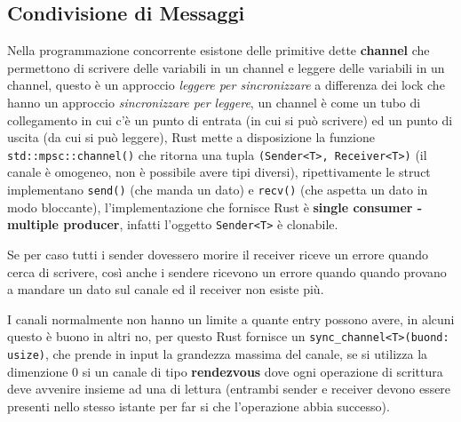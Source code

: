 \documentclass[12pt]{article}
\begin{document}
\subsection{Condivisione di Messaggi}
Nella programmazione concorrente esistone delle primitive dette \textbf{channel} che permettono di scrivere delle variabili in un channel e leggere delle variabili in un channel, questo \`e un approccio \emph{leggere per sincronizzare} a differenza dei lock che hanno un approccio \emph{sincronizzare per leggere}, un channel \`e come un tubo di collegamento in cui c'\`e un punto di entrata (in cui si pu\`o scrivere) ed un punto di uscita (da cui si pu\`o leggere), Rust mette a disposizione la funzione \texttt{std::mpsc::channel()} che ritorna una tupla \texttt{(Sender<T>, Receiver<T>)} (il canale \`e omogeneo, non \`e possibile avere tipi diversi), ripettivamente le struct implementano \texttt{send()} (che manda un dato) e \texttt{recv()} (che aspetta un dato in modo bloccante), l'implementazione che fornisce Rust \`e \textbf{single consumer - multiple producer}, infatti l'oggetto \texttt{Sender<T>} \`e clonabile.

Se per caso tutti i sender dovessero morire il receiver riceve un errore quando cerca di scrivere, cos\`i anche i sendere ricevono un errore quando quando provano a mandare un dato sul canale ed il receiver non esiste pi\`u.

I canali normalmente non hanno un limite a quante entry possono avere, in alcuni questo \`e buono in altri no, per questo Rust fornisce un \texttt{sync\_channel<T>(buond: usize)}, che prende in input la grandezza massima del canale, se si utilizza la dimenzione 0 si un canale di tipo \textbf{rendezvous} dove ogni operazione di scrittura deve avvenire insieme ad una di lettura (entrambi sender e receiver devono essere presenti nello stesso istante per far si che l'operazione abbia successo).
\end{document}
